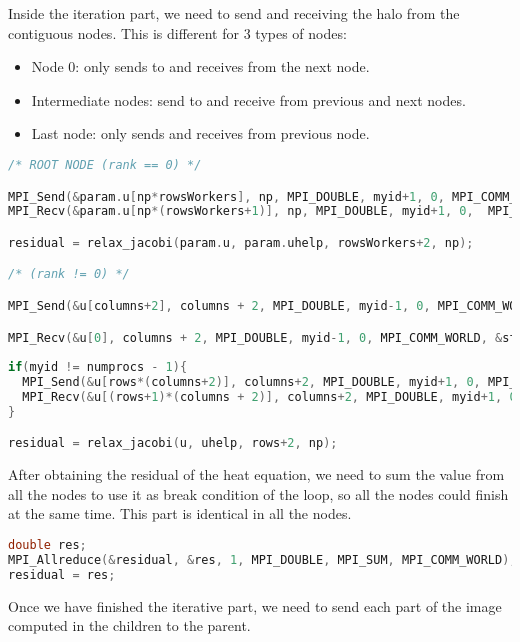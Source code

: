 \documentclass[a4paper, 10pt]{article}
\begin{document}
Inside the iteration part, we need to send and receiving the halo from the contiguous nodes. This is different for 3 types of nodes:

\begin{itemize}
  \item Node 0: only sends to and receives from the next node.
  \item Intermediate nodes: send to and receive from previous and next nodes.
  \item Last node: only sends and receives from previous node.
\end{itemize}

\begin{lstlisting}[language=c, caption={Communications between nodes inside the iterations}]
/* ROOT NODE (rank == 0) */

MPI_Send(&param.u[np*rowsWorkers], np, MPI_DOUBLE, myid+1, 0, MPI_COMM_WORLD);
MPI_Recv(&param.u[np*(rowsWorkers+1)], np, MPI_DOUBLE, myid+1, 0,  MPI_COMM_WORLD, &status);

residual = relax_jacobi(param.u, param.uhelp, rowsWorkers+2, np); 

/* (rank != 0) */

MPI_Send(&u[columns+2], columns + 2, MPI_DOUBLE, myid-1, 0, MPI_COMM_WORLD);

MPI_Recv(&u[0], columns + 2, MPI_DOUBLE, myid-1, 0, MPI_COMM_WORLD, &status);
                    
if(myid != numprocs - 1){
  MPI_Send(&u[rows*(columns+2)], columns+2, MPI_DOUBLE, myid+1, 0, MPI_COMM_WORLD);
  MPI_Recv(&u[(rows+1)*(columns + 2)], columns+2, MPI_DOUBLE, myid+1, 0, MPI_COMM_WORLD, &status);
}

residual = relax_jacobi(u, uhelp, rows+2, np);
\end{lstlisting}

After obtaining the residual of the heat equation, we need to sum the value from all the nodes to use it as break condition of the loop, so all the nodes could finish at the same time. This part is identical in all the nodes.

\begin{lstlisting}[language=c, caption={Allreduce for residual value}]
double res;
MPI_Allreduce(&residual, &res, 1, MPI_DOUBLE, MPI_SUM, MPI_COMM_WORLD);
residual = res;
\end{lstlisting}

Once we have finished the iterative part, we need to send each part of the image computed in the children to the parent.
\end{document}
